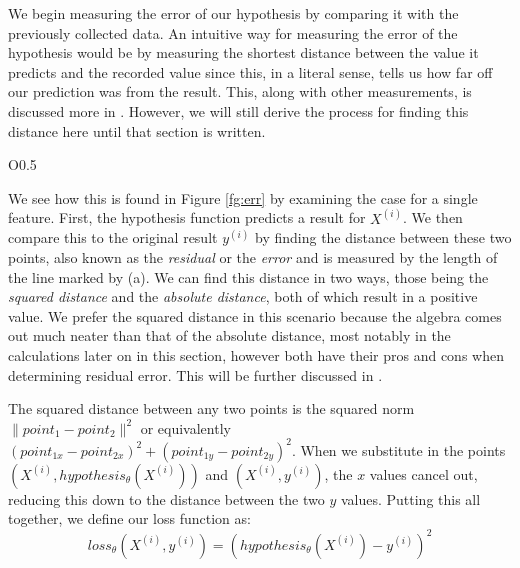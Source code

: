 We begin measuring the error of our hypothesis by comparing it with the
previously collected data.  An intuitive way for measuring the  error of the
hypothesis would be by measuring the shortest distance between the value it
predicts and the recorded value since this, in a literal sense, tells us how far
off our prediction was from the result. This, along with other measurements,
is discussed more in \placeholder. However, we will still derive the process for
finding this distance here until that section is written.

\begin{wrapfigure}{O}{0.5\textwidth}
    \centering
    \caption{Visual representation of the distance between expected and actual
    results.}
    \label{fg:err}
\end{wrapfigure}

We see how this is found in Figure \ref{fg:err} by examining the case for a
single feature. First, the hypothesis function predicts a result for $X^{(i)}$.
We then compare this to the original result $y^{(i)}$ by finding the distance
between these two points, also known as the \emph{residual} or the \emph{error}
and is measured by the length of the line marked by (a). We can find this
distance in two ways, those being the \emph{squared distance} and the
\emph{absolute distance}, both of which result in a positive value. We prefer
the squared distance in this scenario because the algebra comes out much neater
than that of the absolute distance, most notably in the calculations later on in
this section, however both have their pros and cons when determining residual
error. This will be further discussed in \placeholder.

The squared distance between any two points is the squared norm $\| point_1 -
point_2 \|^2$ or equivalently $(point_{1x}-point_{2x})^2 +
(point_{1y}-point_{2y})^2$. When we substitute in the points $(X^{(i)},
hypothesis_{\theta}(X^{(i)}))$ and $(X^{(i)}, y^{(i)})$, the $x$ values cancel
out, reducing this down to the distance between the two $y$ values. Putting this
all together, we define our loss function as:
\begin{equation}
    loss_{\theta}(X^{(i)}, y^{(i)}) = (hypothesis_{\theta}(X^{(i)}) - y^{(i)})^2
\end{equation}

